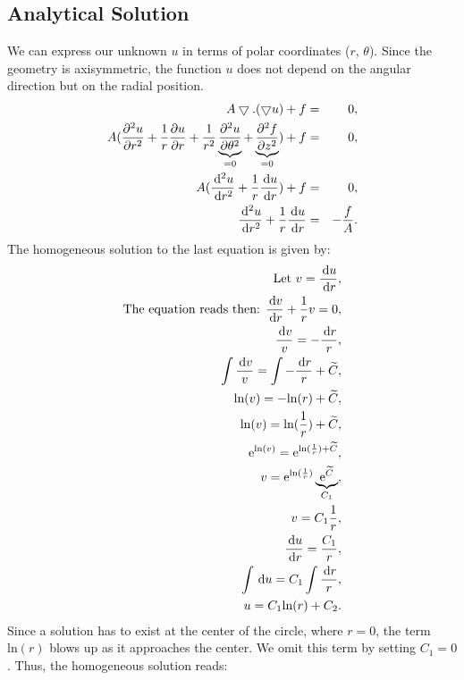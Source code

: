 \documentclass[a4paper,12pt]{article}
\newcommand{\intd}{\,{\rm d}}
\begin{document}
\subsection{Analytical Solution}\label{sec:analsol}
We can express our unknown $u$ in terms of polar coordinates ($r$, $\theta$). Since the geometry is axisymmetric, the function $u$ does not depend on the angular direction but on the radial position. 
\begin{eqnarray}
 A \bigtriangledown.(\bigtriangledown u) + f &=& 0,\\
 A (\frac{\partial^2 u}{\partial r^2} + \frac{1}{r}\frac{\partial u}{\partial r} + \frac{1}{r^2}\underbrace{\frac{\partial ^2u}{\partial \theta^2}}_{=0} + \underbrace{\frac{\partial ^2 f}{\partial z^2}}_{=0}) + f &=& 0,\\
 A (\frac{\intd^2 u}{\intd r^2} + \frac{1}{r}\frac{\intd u}{\intd r}) + f &=& 0,\\
 \frac{\intd^2 u}{\intd r^2} + \frac{1}{r}\frac{\intd u}{\intd r} &=& -\frac{f}{A}.\\
\end{eqnarray}
The homogeneous solution to the last equation is given by:\
\begin{eqnarray}
 \text{Let } v =  \frac{\intd u}{\intd r},\\
 \text{The equation reads then: }\frac{\intd v}{\intd r}+\frac{1}{r}v = 0,\\
 \frac{\intd v}{v} = -\frac{\intd r}{r},\\
\int \frac{\intd v}{ v} = \int -\frac{\intd r}{r} + \widetilde{C},\\
\text{ln}(v) = - \text{ln}(r) + \widetilde{C},\\
\text{ln}(v) = \text{ln}(\frac{1}{r}) + \widetilde{C},\\
\text{e}^{\text{ln}(v) } = \text{e}^{\text{ln}(\frac{1}{r}) + \widetilde{C}},\\
v = \text{e}^{\text{ln}(\frac{1}{r})}\underbrace{\text{e}^{\widetilde{C}}}_{C_1},\\
v = C_1\frac{1}{r},\\
\frac{\intd u}{\intd r} = \frac{C_1}{r},\\
\int \intd u =  C_1 \int \frac{\intd r}{r},\\
u = C_1 \text{ln}(r) + C_2.\\ 
\end{eqnarray}
Since a solution has to exist at the center of the circle, where $r = 0$, the term $\text{ln}(r)$ blows up as it approaches the center. We omit this term by setting $C_1 = 0$. Thus, the homogeneous solution reads:
\end{document}
